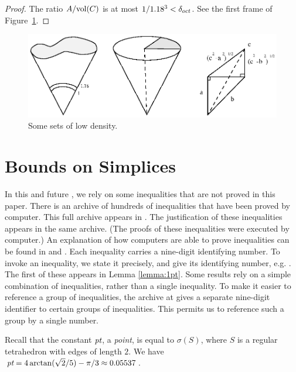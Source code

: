 \begin{proof} The ratio $A/{\operatorname{vol}}(C)$ is at most $1/1.18^3 < \delta_{oct}$.   See the
first frame of Figure~\ref{fig:doct}.
\end{proof}

\begin{figure}[htb]
  \centering
  \includegraphics{PS/haII42.ps}
  \caption{Some sets of low density.}
  \label{fig:doct}
\end{figure}

\section{Bounds on Simplices}\label{sec:bounds-simplex}

In this and future \chaps,
we rely on some inequalities that are not proved in
this paper.  There is an archive of hundreds of inequalities that
have been proved by computer.  This full archive appears in
\cite{web}.  The justification of these inequalities appears in
the same archive.  (The proofs of these inequalities were executed
by computer.)  An explanation of how computers are able to prove
inequalities can be found in \cite{algorithm} and \cite{part1}.
Each inequality carries a nine-digit identifying number. To invoke
an inequality, we state it precisely, and give its identifying
number, e.g. . The first of these appears in Lemma
\ref{lemma:1pt}.  Some results rely on a simple combination of
inequalities, rather than a single inequality.  To make it easier
to reference a group of inequalities, the archive at \cite{web}
gives a separate nine-digit identifier to certain groups of
inequalities.  This permits us to reference such a group by a
single number.
%


\begin{definition} \label{def:point}
Recall that the constant $\hbox{\it pt}$, a {\it point},  is equal to
$\sigma(S)$, where $S$ is a regular tetrahedron with edges of
length $2$. We have $\hbox{\it pt} = 4\arctan(\sqrt2/5) - \pi/3 \approx
0.05537$.
\end{definition}


